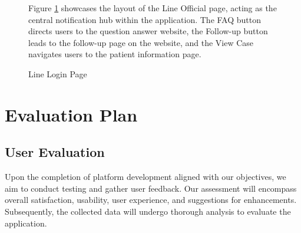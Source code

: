 \documentclass[12pt,oneside,openright,a4paper]{cpe-english-project}
\begin{document}
\begin{figure}[!h]
\begin{minipage}{.3\textwidth}
      \end{minipage}%
    
      \caption{Line Login Page}\label{fig:Line_Login_Page}
      \begin{justify}
        \qquad Figure \ref{fig:Line_Login_Page} showcases the layout of the Line Official page, acting as the central notification hub within the application. The FAQ button directs users to the question answer website, the Follow-up button leads to the follow-up page on the website, and the View Case navigates users to the patient information page. \par
      \end{justify}
    \end{figure}
\newpage
  \section{Evaluation Plan}
    \subsection{User Evaluation}
      \qquad Upon the completion of platform development aligned with our objectives, we aim to conduct testing and gather user feedback. Our assessment will encompass overall satisfaction, usability, user experience, and suggestions for enhancements. Subsequently, the collected data will undergo thorough analysis to evaluate the application. \par
\end{document}
